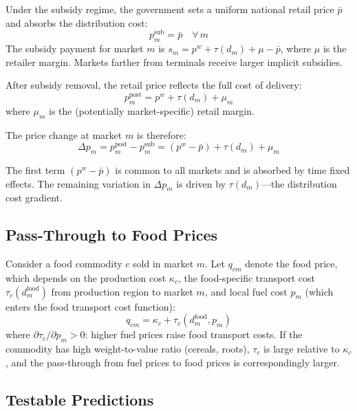 \documentclass[12pt]{article}
\begin{document}
Under the subsidy regime, the government sets a uniform national retail price $\bar{p}$ and absorbs the distribution cost:
\begin{equation}
    p_m^{\text{sub}} = \bar{p} \quad \forall \, m
    \label{eq:subsidy}
\end{equation}
The subsidy payment for market $m$ is $s_m = p^w + \tau(d_m) + \mu - \bar{p}$, where $\mu$ is the retailer margin. Markets farther from terminals receive larger implicit subsidies.

After subsidy removal, the retail price reflects the full cost of delivery:
\begin{equation}
    p_m^{\text{post}} = p^w + \tau(d_m) + \mu_m
    \label{eq:post}
\end{equation}
where $\mu_m$ is the (potentially market-specific) retail margin.

The price change at market $m$ is therefore:
\begin{equation}
    \Delta p_m = p_m^{\text{post}} - p_m^{\text{sub}} = (p^w - \bar{p}) + \tau(d_m) + \mu_m
    \label{eq:delta}
\end{equation}

The first term $(p^w - \bar{p})$ is common to all markets and is absorbed by time fixed effects. The remaining variation in $\Delta p_m$ is driven by $\tau(d_m)$---the distribution cost gradient.

\subsection{Pass-Through to Food Prices}

Consider a food commodity $c$ sold in market $m$. Let $q_{cm}$ denote the food price, which depends on the production cost $\kappa_c$, the food-specific transport cost $\tau_c(d_m^{\text{food}})$ from production region to market $m$, and local fuel cost $p_m$ (which enters the food transport cost function):
\begin{equation}
    q_{cm} = \kappa_c + \tau_c(d_m^{\text{food}}, p_m)
    \label{eq:food}
\end{equation}
where $\partial \tau_c / \partial p_m > 0$: higher fuel prices raise food transport costs. If the commodity has high weight-to-value ratio (cereals, roots), $\tau_c$ is large relative to $\kappa_c$, and the pass-through from fuel prices to food prices is correspondingly larger.

\subsection{Testable Predictions}
\end{document}

